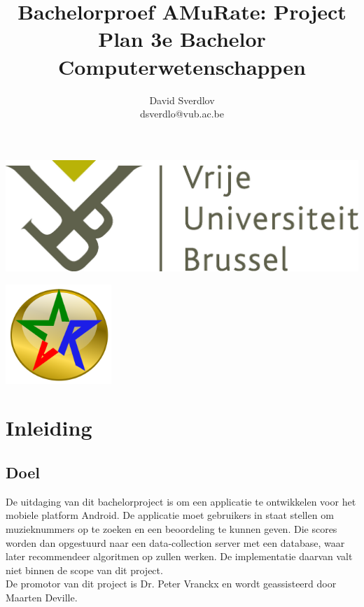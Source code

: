 \documentclass[11pt,a4paper]{article}
\author{David Sverdlov \\ dsverdlo@vub.ac.be}
\title{Bachelorproef AMuRate: Project Plan 3e Bachelor Computerwetenschappen}
\begin{document}
\begin{flushleft}
\noindent \includegraphics[width=0.6\linewidth]{Pictures/vub_logo.jpg} 
\end{flushleft}
{\let\newpage\relax\maketitle} %

\begin{center}
\includegraphics[width=4cm]{Pictures/amr_gold_thick.png} 
\end{center}



\newpage
\tableofcontents

\newpage
\section{Inleiding} 
\label{sec:Inleiding}

	\subsection{Doel} 
	\label{sec:Doel}
De uitdaging van dit bachelorproject is om een applicatie te ontwikkelen voor het mobiele platform Android. De applicatie moet gebruikers in staat stellen om muzieknummers op te zoeken en een beoordeling te kunnen geven. Die scores worden dan opgestuurd naar een data-collection server met een database, waar later recommendeer algoritmen op zullen werken. De implementatie daarvan valt niet binnen de scope van dit project. \\
De promotor van dit project is Dr. Peter Vranckx en wordt geassisteerd door Maarten Deville.
\end{document}
